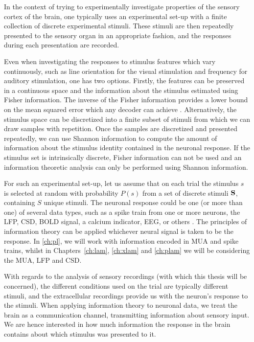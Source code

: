 In the context of trying to experimentally investigate properties of the sensory cortex of the brain, one typically uses an experimental set-up with a finite collection of discrete experimental stimuli.
These stimuli are then repeatedly presented to the sensory organ in an appropriate fashion, and the responses during each presentation are recorded.

Even when investigating the responses to stimulus features which vary continuously, such as line orientation for the visual stimulation and frequency for auditory stimulation, one has two options.
Firstly, the features can be preserved in a continuous space and the information about the stimulus estimated using Fisher information. The inverse of the Fisher information provides a lower bound on the mean squared error which any decoder can achieve \citep{Quiroga2009}.
Alternatively, the stimulus space can be discretized into a finite subset of stimuli from which we can draw samples with repetition.
Once the samples are discretized and presented repeatedly, we can use Shannon information to compute the amount of information about the stimulus identity contained in the neuronal response.
If the stimulus set is intrinsically discrete, Fisher information can not be used and an information theoretic analysis can only be performed using Shannon information.

For such an experimental set-up, let us assume that on each trial the stimulus $s$ is selected at random with probability $P(s)$ from a set of discrete stimuli $\mathbf{S}$, containing $S$ unique stimuli.
The neuronal response could be one (or more than one) of several data types, such as a spike train from one or more neurons, the \ac{LFP}, \ac{CSD}, \ac{BOLD} signal, a calcium indicator, \ac{EEG}, or others \citep{Magri2009,Quiroga2009}.
The principles of information theory can be applied whichever neural signal is taken to be the response.
In \autoref{ch:pl}, we will work with information encoded in \ac{MUA} and spike trains, whilst in Chapters~\ref{ch:lam}, \ref{ch:xlam} and \ref{ch:plam} we will be considering the \ac{MUA}, \ac{LFP} and \ac{CSD}.

With regards to the analysis of sensory recordings (with which this thesis will be concerned), the different conditions used on the trial are typically different stimuli, and the extracellular recordings provide us with the neuron's response to the stimuli.
When applying information theory to neuronal data, we treat the brain as a communication channel, transmitting information about sensory input.
We are hence interested in how much information the response in the brain contains about which stimulus was presented to it.

